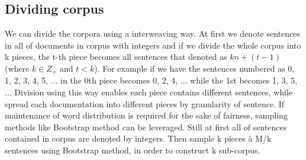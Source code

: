   \subsection{Dividing corpus}
  We can divide the corpora using a interweaving way. At first we denote sentences in all of documents in corpus with integers and if we divide the whole corpus into k pieces, the t-th piece becomes all sentences that denoted as $kn+(t-1)$ (where $k\in Z_+$ and $t<k$). For example if we have the sentences numbered as 0, 1, 2, 3, 4, 5, ... in the 0th piece becomes 0, 2, 4, ... while the 1st becomes 1, 3, 5, ... Division using this way enables each piece contains different sentences, while spread each documentation into different pieces by granularity of sentence.
  If maintenance of word distribution is required for the sake of fairness, sampling methods like Bootstrap method \cite{efron1992bootstrap} can be leveraged. Still at first all of sentences contained in corpus are denoted by integers. Then sample k pieces {\`a} M/k sentences using Bootstrap method, in order to construct k sub-corpus.
